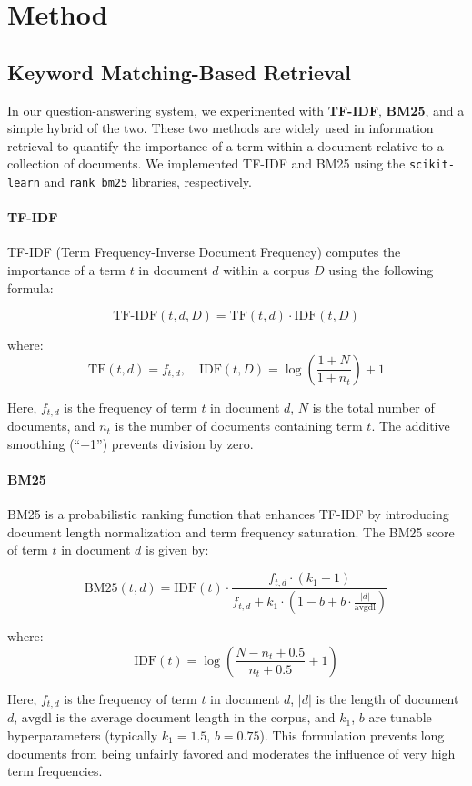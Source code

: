 \documentclass[twoside]{article}
\begin{document}
\section{Method}

\subsection{Keyword Matching-Based Retrieval}
In our question-answering system, we experimented with \textbf{TF-IDF}, \textbf{BM25}, and a simple hybrid of the two. These two methods are widely used in information retrieval to quantify the importance of a term within a document relative to a collection of documents. We implemented TF-IDF and BM25 using the \texttt{scikit-learn} and \texttt{rank\_bm25} libraries, respectively.

\paragraph*{TF-IDF}

TF-IDF (Term Frequency-Inverse Document Frequency) computes the importance of a term $t$ in document $d$ within a corpus $D$ using the following formula:

\[
\text{TF-IDF}(t, d, D) = \text{TF}(t, d) \cdot \text{IDF}(t, D)
\]

where:
\[
\text{TF}(t, d) = f_{t,d}, \quad \text{IDF}(t, D) = \log \left( \frac{1 + N}{1 + n_t} \right) + 1
\]

Here, $f_{t,d}$ is the frequency of term $t$ in document $d$, $N$ is the total number of documents, and $n_t$ is the number of documents containing term $t$. The additive smoothing (``+1'') prevents division by zero.

\paragraph*{BM25}

BM25 is a probabilistic ranking function that enhances TF-IDF by introducing document length normalization and term frequency saturation. The BM25 score of term $t$ in document $d$ is given by:

\[
\text{BM25}(t, d) = \text{IDF}(t) \cdot \frac{f_{t,d} \cdot (k_1 + 1)}{f_{t,d} + k_1 \cdot (1 - b + b \cdot \frac{|d|}{\text{avgdl}})}
\]

where:
\[
\text{IDF}(t) = \log \left( \frac{N - n_t + 0.5}{n_t + 0.5} + 1 \right)
\]

Here, $f_{t,d}$ is the frequency of term $t$ in document $d$, $|d|$ is the length of document $d$, $\text{avgdl}$ is the average document length in the corpus, and $k_1$, $b$ are tunable hyperparameters (typically $k_1 = 1.5$, $b = 0.75$). This formulation prevents long documents from being unfairly favored and moderates the influence of very high term frequencies.
\end{document}
